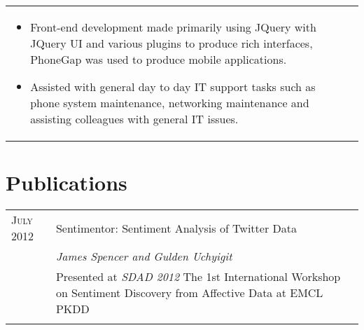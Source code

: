 \documentclass[a4paper,10pt]{article} %
\begin{document}
\begin{tabular}{ L{2cm} | L{11cm}}
\begin{itemize}[leftmargin=*]
\item Front-end development made primarily using JQuery with JQuery UI and various plugins to produce rich interfaces, PhoneGap was used to produce mobile applications. 

\item Assisted with general day to day IT support tasks such as phone system maintenance, networking maintenance and assisting colleagues with general IT issues.



\end{itemize} \\


\end{tabular}




\section{Publications}

\begin{tabular}{ L{2cm} | L{11cm}}	
\textsc{July} 2012 & Sentimentor: Sentiment Analysis of Twitter Data\\
& \small\emph{James Spencer and Gulden Uchyigit} \\
& \small Presented at \emph{SDAD 2012  } The 1st International Workshop on Sentiment Discovery from Affective Data at EMCL PKDD\\



&\\
\end{tabular}


\end{document}
